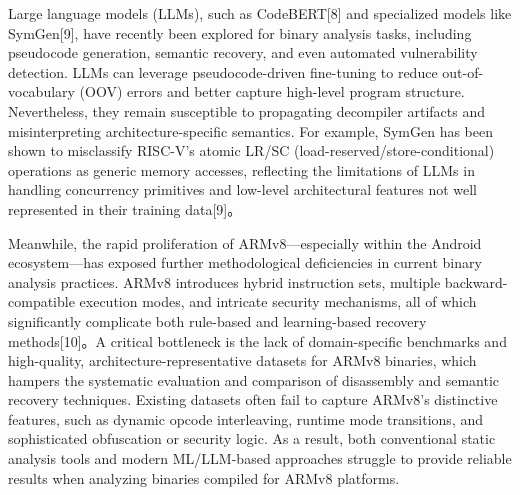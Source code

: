 \documentclass[acmsmall,screen,review,anonymous]{acmart} %
\begin{document}
Large language models (LLMs), such as CodeBERT[8] and specialized models like SymGen[9], have recently been explored for binary analysis tasks, including pseudocode generation, semantic recovery, and even automated vulnerability detection. LLMs can leverage pseudocode-driven fine-tuning to reduce out-of-vocabulary (OOV) errors and better capture high-level program structure. Nevertheless, they remain susceptible to propagating decompiler artifacts and misinterpreting architecture-specific semantics. For example, SymGen has been shown to misclassify RISC-V’s atomic LR/SC (load-reserved/store-conditional) operations as generic memory accesses, reflecting the limitations of LLMs in handling concurrency primitives and low-level architectural features not well represented in their training data[9]。

Meanwhile, the rapid proliferation of ARMv8—especially within the Android ecosystem—has exposed further methodological deficiencies in current binary analysis practices. ARMv8 introduces hybrid instruction sets, multiple backward-compatible execution modes, and intricate security mechanisms, all of which significantly complicate both rule-based and learning-based recovery methods[10]。A critical bottleneck is the lack of domain-specific benchmarks and high-quality, architecture-representative datasets for ARMv8 binaries, which hampers the systematic evaluation and comparison of disassembly and semantic recovery techniques. Existing datasets often fail to capture ARMv8’s distinctive features, such as dynamic opcode interleaving, runtime mode transitions, and sophisticated obfuscation or security logic. As a result, both conventional static analysis tools and modern ML/LLM-based approaches struggle to provide reliable results when analyzing binaries compiled for ARMv8 platforms.
\end{document}
